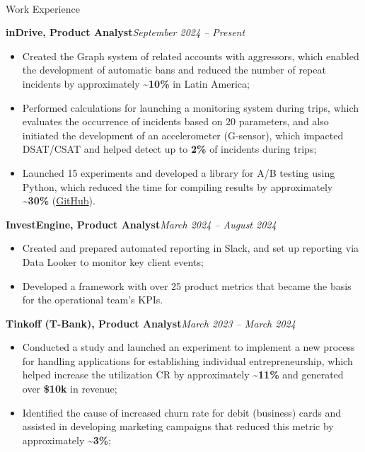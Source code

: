 \documentclass[]{mcdowellcv}
\renewenvironment{cvsubsection}[2]{%
  \begin{adjustwidth}{\subsectionmargin}{\subsectionmargin}%
    {\bfseries #1}\hfill #2\par\vspace{0.5em}%
}{%
  \end{adjustwidth}%
  \vspace*{\aftersubsectionspace}%
}
\renewcommand{\makeheader}{%
  \begin{center}
    \printname\\[0.5em]%
    \printcontacts%
  \end{center}%
  \vspace*{\afterheaderspace}%
}
\begin{document}
	\makeheader
	
	\begin{cvsection}{\Large Work Experience}
		\begin{cvsubsection}{inDrive, Product Analyst}{\textit{September 2024 -- Present}}
			\begin{itemize}
				\item Created the Graph system of related accounts with aggressors, which enabled the development of automatic bans and reduced the number of repeat incidents by approximately \textbf{\textasciitilde 10\%} in Latin America;
				\item Performed calculations for launching a monitoring system during trips, which evaluates the occurrence of incidents based on 20 parameters, and also initiated the development of an accelerometer (G-sensor), which impacted DSAT/CSAT and helped detect up to \textbf{2\%} of incidents during trips;
				\item Launched 15 experiments and developed a library for A/B testing using Python, which reduced the time for compiling results by approximately \textbf{\textasciitilde 30\%} (\href{https://github.com/Renarion/expab}{GitHub}).
			\end{itemize}
		\end{cvsubsection}
		
		\begin{cvsubsection}{InvestEngine, Product Analyst}{\textit{March 2024 -- August 2024}}
			\begin{itemize}
				\item Created and prepared automated reporting in Slack, and set up reporting via Data Looker to monitor key client events;
				\item Developed a framework with over 25 product metrics that became the basis for the operational team's KPIs.
			\end{itemize}
		\end{cvsubsection}
		
		\begin{cvsubsection}{Tinkoff (T-Bank), Product Analyst}{\textit{March 2023 -- March 2024}}
			\begin{itemize}
				\item Conducted a study and launched an experiment to implement a new process for handling applications for establishing individual entrepreneurship, which helped increase the utilization CR by approximately \textbf{\textasciitilde 11\%} and generated over \textbf{\$10k} in revenue;
				\item Identified the cause of increased churn rate for debit (business) cards and assisted in developing marketing campaigns that reduced this metric by approximately \textbf{\textasciitilde 3\%};
			\end{itemize}
		\end{cvsubsection}
		

\end{cvsection}
\end{document}
